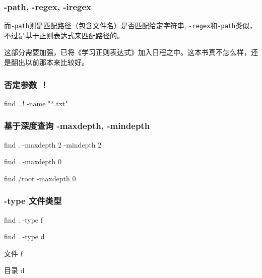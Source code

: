 \subsubsection{ -path, -regex, -iregex}


而\lstinline$-path$则是匹配路径（包含文件名）是否匹配给定字符串, \lstinline$-regex$和\lstinline$-path$类似，不过是基于正则表达式来匹配路径的。

这部分需要加强，已将《学习正则表达式》加入日程之中。这本书真不怎么样，还是翻出以前那本来比较好。


\subsubsection{否定参数 ！}

\begin{Bash}

find . ! -name "*.txt"

\end{Bash}


\subsubsection{基于深度查询 -maxdepth, -mindepth}

\begin{Bash}[查找第二层目录的所有文件]

find . -maxdepth 2 -mindepth 2

\end{Bash}

\begin{Bash}

find . -maxdepth 0

find /root -maxdepth 0

\end{Bash}

\subsubsection{-type 文件类型}

\begin{Bash}

find . -type f 

find . -type d

\end{Bash}



文件		f

目录		d

